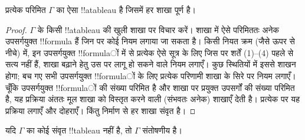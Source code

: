 \documentclass[../../../include/open-logic-section]{subfiles}
\begin{document}
\begin{prop}
  प्रत्येक परिमित $\Gamma$ का ऐसा !!a{tableau} है जिसमें हर शाखा पूर्ण है।
\end{prop}

\begin{proof}
  $\Gamma$ के किसी !!a{tableau} की खुली शाखा पर विचार करें। शाखा में ऐसे
  परिमिततः अनेक उपसर्गयुक्त !!{formula} हैं जिन पर कोई नियम लगाया जा सकता
  है। किसी नियत क्रम (जैसे ऊपर से नीचे) में, इन उपसर्गयुक्त !!{formula}ों में
  से प्रत्येक ऐसे सूत्र के लिए जिस पर शर्तें (1)--(4) पहले से सत्य नहीं
  हैं, शाखा बढ़ाने हेतु उस पर लागू हो सकने वाले नियम लगाएँ। कुछ स्थितियों
  में इससे शाखन होगा; बच गए सभी उपसर्गयुक्त !!{formula}ों के लिए प्रत्येक
  परिणामी शाखा के सिरे पर नियम लगाएँ। चूँकि उपसर्गयुक्त !!{formula}ों की
  संख्या परिमित है और शाखा पर प्रयुक्त उपसर्गों की संख्या परिमित है, यह
  प्रक्रिया अंततः मूल शाखा को विस्तृत करने वाली (संभवतः अनेक) शाखाएँ देती
  है। प्रत्येक पर यह प्रक्रिया लगाएँ और दोहराएँ। किंतु निर्माण से हर शाखा
  संवृत है।
\end{proof}

\begin{thm}[पूर्णता]
  यदि $\Gamma$ का कोई संवृत !!{tableau} नहीं है, तो $\Gamma$ संतोषणीय है।
\end{thm}
\end{document}
